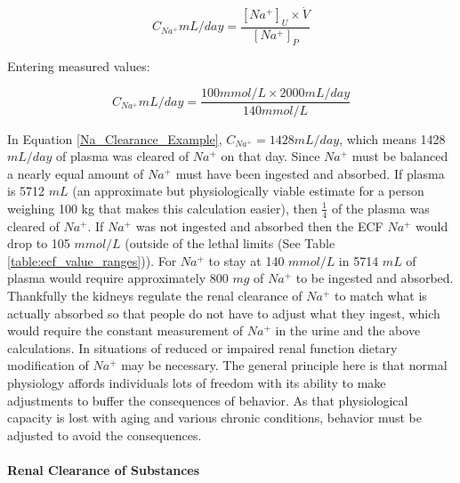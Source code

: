 \begin{equation}
    C_{Na^+} mL/day = \frac{[Na^+]_{U} \times \dot{V}}{[Na^+]_{P}}
    \label{Na_Clearance}
\end{equation}

\vspace{4mm}

Entering measured values:

\vspace{4mm}

\begin{equation}
    C_{Na^+} mL/day = \frac{100 mmol/L \times 2000 mL/day}{140 mmol/L}
    \label{Na_Clearance_Example}
\end{equation}

\vspace{4mm}

In Equation \ref{Na_Clearance_Example}, $C_{Na^+} = 1428 mL/day$, which means 1428 $mL/day$ of plasma was cleared of $Na^+$ on that day. Since $Na^+$ must be balanced a nearly equal amount of $Na^+$ must have been ingested and absorbed. If plasma is 5712 $mL$ (an approximate but physiologically viable estimate for a person weighing 100 kg that makes this calculation easier), then $\frac{1}{4}$ of the plasma was cleared of $Na^+$. If $Na^+$ was not ingested and absorbed then the ECF $Na^+$ would drop to 105 $mmol/L$ (outside of the lethal limits (See Table \ref{table:ecf_value_ranges})). For $Na^+$ to stay at 140 $mmol/L$ in 5714 $mL$ of plasma would require approximately 800 $mg$ of $Na^+$ to be ingested and absorbed.\footnotemark{}
Thankfully the kidneys regulate the renal clearance of $Na^+$ to match what is actually absorbed so that people do not have to adjust what they ingest, which would require the constant measurement of $Na^+$ in the urine and the above calculations.\footnotemark{} In situations of reduced or impaired renal function dietary modification of $Na^+$ may be necessary. The general principle here is that normal physiology affords individuals lots of freedom with its ability to make adjustments to buffer the consequences of behavior. As that physiological capacity is lost with aging and various chronic conditions, behavior must be adjusted to avoid the consequences. 

\paragraph{Renal Clearance of Substances}

